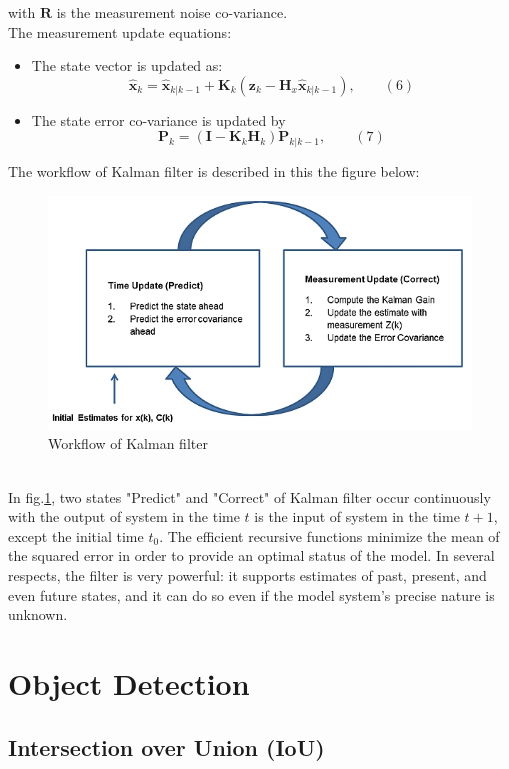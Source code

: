 with $\textbf{R}$ is the measurement noise co-variance.\\
The measurement update equations:
\begin{itemize}
    \item The state vector is updated as:
        \begin{displaymath}
                      \hat{\textbf{x}}_k = \hat{\textbf{x}}_{k|k-1} + \textbf{K}_k(\textbf{z}_k - \textbf{H}_x\hat{\textbf{x}}_{k|k-1}), \qquad (6)
        \end{displaymath}
    \item The state error co-variance is updated by
        \begin{displaymath}
                      \textbf{P}_k = (\textbf{I} -  \textbf{K}_k\textbf{H}_k)\textbf{P}_{k|k-1}, \qquad (7)
        \end{displaymath}
\end{itemize}
\pagebreak
The workflow of Kalman filter is described in this the figure below:
\begin{figure}[h!]
    \centering
    \includegraphics[scale=0.7]{Chapters/Fig/kal_dig_2.png}
    \caption{Workflow of Kalman filter}
    \label{fig:kalman_wf}
\end{figure}
\\
In fig.\ref{fig:kalman_wf}, two states "Predict" and "Correct" of Kalman filter occur continuously with the output of system in the time $t$ is the input of system in the time $t+1$, except the initial time $t_0$. The efficient recursive functions minimize the mean of the squared error in order to provide an optimal status of the model. In several respects, the filter is very powerful: it supports estimates of past, present, and even future states, and it can do so even if the model system's precise nature is unknown.
\section{Object Detection}
\subsection{Intersection over Union (IoU)}
